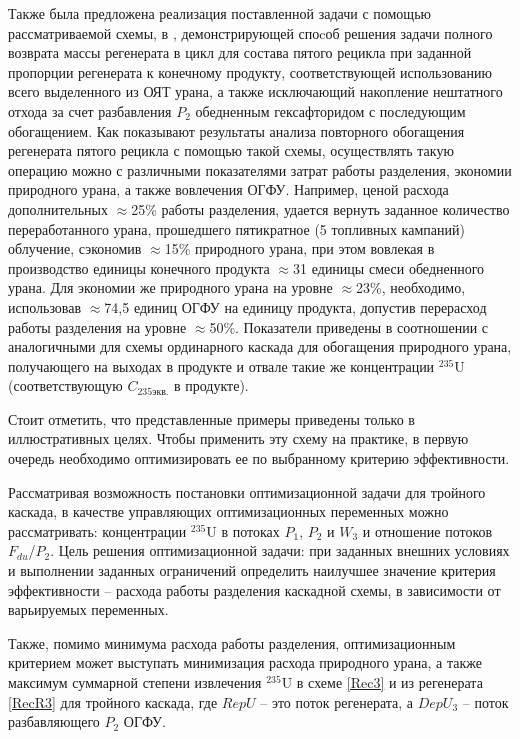 Также была предложена реализация поставленной задачи с помощью рассматриваемой схемы, в \cite{gusevMultycascadeEnrichmentSchemes2020}, демонстрирующей споcоб решения задачи полного возврата массы регенерата в цикл для состава пятого рецикла при заданной пропорции регенерата к конечному продукту, соответствующей использованию всего выделенного из ОЯТ урана, а также исключающий накопление нештатного отхода за счет разбавления $P_2$ обедненным гексафторидом с последующим обогащением. Как показывают результаты анализа повторного обогащения регенерата пятого рецикла с помощью такой схемы, осуществлять такую операцию можно с различными показателями затрат работы разделения, экономии природного урана, а также вовлечения ОГФУ. Например, ценой расхода дополнительных $\approx$25\% работы разделения, удается вернуть заданное количество переработанного урана, прошедшего пятикратное (5 топливных кампаний) облучение, сэкономив $\approx$15\% природного урана, при этом вовлекая в производство единицы конечного продукта $\approx$31 единицы смеси обедненного урана. Для экономии же природного урана на уровне $\approx$23\%, необходимо, использовав $\approx$74,5 единиц ОГФУ на единицу продукта, допустив перерасход работы разделения на уровне $\approx$50\%. Показатели приведены в соотношении с аналогичными для схемы ординарного каскада для обогащения природного урана, получающего на выходах в продукте и отвале такие же концентрации $^{235}$U (соответствующую $C_{235 экв.}$ в продукте).


Стоит отметить, что представленные примеры приведены только в иллюстративных целях. Чтобы применить эту схему на практике, в первую очередь необходимо оптимизировать ее по выбранному критерию эффективности.

Рассматривая возможность постановки оптимизационной задачи для тройного каскада, в качестве управляющих оптимизационных переменных можно рассматривать: концентрации $^{235}$U в потоках $P_1$, $P_2$ и $W_3$ и отношение потоков $F_{du}$/$P_2$.
Цель решения оптимизационной задачи: при заданных внешних условиях и выполнении заданных ограничений определить наилучшее значение критерия эффективности -- расхода работы разделения каскадной схемы, в зависимости от варьируемых переменных.

Также, помимо минимума расхода работы разделения, оптимизационным критерием может выступать минимизация расхода природного урана, а также максимум суммарной степени извлечения $^{235}$U в схеме \ref{Rec3} и из регенерата \ref{RecR3} для тройного каскада, где $RepU$ -- это поток регенерата, а $DepU_{3}$ -- поток разбавляющего $P_2$ ОГФУ.


